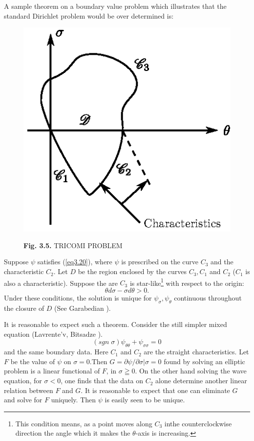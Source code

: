 A sample theorem on a boundary value problem which illustrates that the standard Dirichlet problem would be over determined is:
\begin{figure}[H]
\centering
\includegraphics{figures/fig3.5.eps}
\centerline{{\bf Fig. 3.5.} TRICOMI PROBLEM}
\end{figure}

\begin{theorem*}
Suppose $\psi$ satisfies (\ref{eq3.20}), where $\psi$ is prescribed on the curve $C_3$ and the characteristic $C_2$. Let $D$ be the region enclosed by the curves $C_3, C_1$ and $C_2$ ($C_1$ is also a characteristic). Suppose the are $C_3$ is star-like\footnote{This condition means, as a point moves along $C_3$  inthe counterclockwise direction the angle which it makes the $\theta$-axis is increasing.} with respect to the origin:
$$
\theta d \sigma - \sigma d \theta >0.
$$
Under these conditions, the solution is unique for $\psi_\sigma, \psi_\theta$ continuous throughout the closure of $D$ (See Garabedian \cite{key13}).
\end{theorem*}

It is reasonable to expect such a theorem. Consider the still simpler mixed equation (Lavrente'v, Bitsadze \cite{key22}).
\begin{equation*}
(sgn \; \sigma) \psi_{\theta \theta} + \psi_{\sigma\sigma} = 0
\tag{3.21}\label{eq3.21}
\end{equation*}
and the same boundary data. Here $C_1$ and $C_2$ are the straight characteristics. Let $F$ be the value of $\psi$ on $\sigma = 0$.\pageoriginale Then $G = \partial \psi / \partial \sigma | \sigma = 0$ found by solving an elliptic problem is a linear functional of $F$, in $\sigma \geqq 0$. On the other hand solving the wave equation, for $\sigma < 0$, one finds that the data on $C_2$ alone determine another linear relation between $F$ and $G$. It is reasonable to expect that one can eliminate $G$ and solve for $F$ uniquely. Then $\psi$ is easily seen to be unique.


